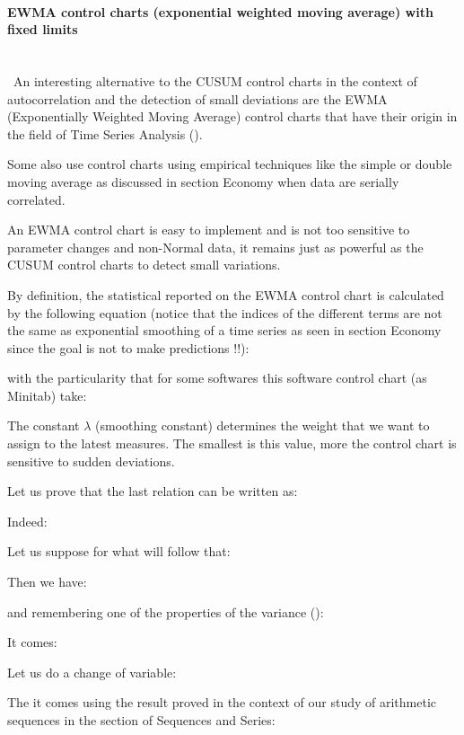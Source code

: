 	\paragraph{EWMA control charts (exponential weighted moving average) with fixed limits}\mbox{}\\\
	An interesting alternative to the CUSUM control charts in the context of autocorrelation and the detection of small deviations are the EWMA (Exponentially Weighted Moving Average) control charts that have their origin in the field of Time Series Analysis ().

	\begin{tcolorbox}[title=Remark,colframe=black,arc=10pt]
	Some also use control charts using empirical techniques like the simple or double moving average as discussed in section Economy when data are serially correlated.
	\end{tcolorbox}
	An EWMA control chart is easy to implement and is not too sensitive to parameter changes and non-Normal data, it remains just as powerful as the CUSUM control charts to detect small variations.

	By definition, the statistical reported on the EWMA control chart is calculated by the following equation (notice that the indices of the different terms are not the same as exponential smoothing of a time series as seen in section Economy since the goal is not to make predictions !!):
	
	
	with the particularity that for some softwares this software control chart (as Minitab) take:
	
	The constant $\lambda$ (smoothing constant) determines the weight that we want to assign to the latest measures. The smallest is this value, more the control chart is sensitive to sudden deviations.

	Let us prove that the last relation can be written as:
	
	Indeed:
	
	Let us suppose for what will follow that:
	
	Then we have:
	
	and remembering one of the properties of the variance ():
	
	It comes:
	
	Let us do a change of variable:
	
	The it comes using the result proved in the context of our study of arithmetic sequences in the section of Sequences and Series:
	
